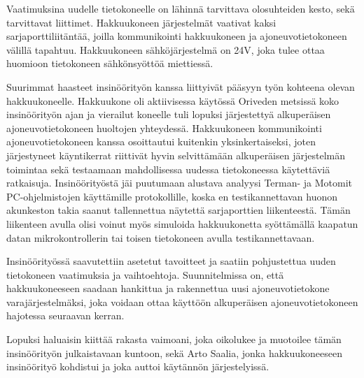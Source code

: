 \documentclass[11pt,a4paper,oneside,article]{memoir}
\begin{document}
Vaatimuksina uudelle tietokoneelle on lähinnä tarvittava olosuhteiden kesto, sekä tarvittavat liittimet. Hakkuukoneen järjestelmät vaativat kaksi sarjaporttiliitäntää, joilla kommunikointi hakkuukoneen ja ajoneuvotietokoneen välillä tapahtuu. Hakkuukoneen sähköjärjestelmä on 24V, joka tulee ottaa huomioon tietokoneen sähkönsyöttöä miettiessä. 

Suurimmat haasteet insinöörityön kanssa liittyivät pääsyyn työn kohteena olevan hakkuukoneelle. Hakkuukone oli aktiivisessa käytössä Oriveden metsissä koko insinöörityön ajan ja vierailut koneelle tuli lopuksi järjestettyä alkuperäisen ajoneuvotietokoneen huoltojen yhteydessä. Hakkuukoneen kommunikointi ajoneuvotietokoneen kanssa osoittautui kuitenkin yksinkertaiseksi, joten järjestyneet käyntikerrat riittivät hyvin selvittämään alkuperäisen järjestelmän toimintaa sekä testaamaan mahdollisessa uudessa tietokoneessa käytettäviä ratkaisuja. Insinöörityöstä jäi puutumaan alustava analyysi Terman- ja Motomit PC-ohjelmistojen käyttämille protokollille, koska en testikannettavan huonon akunkeston takia saanut tallennettua näytettä sarjaporttien liikenteestä. Tämän liikenteen avulla olisi voinut myös simuloida hakkuukonetta syöttämällä kaapatun datan mikrokontrollerin tai toisen tietokoneen avulla testikannettavaan.

Insinöörityössä saavutettiin asetetut tavoitteet ja saatiin pohjustettua uuden tietokoneen vaatimuksia ja vaihtoehtoja. Suunnitelmissa on, että hakkuukoneeseen saadaan hankittua ja rakennettua uusi ajoneuvotietokone varajärjestelmäksi, joka voidaan ottaa käyttöön alkuperäisen ajoneuvotietokoneen hajotessa seuraavan kerran.

Lopuksi haluaisin kiittää rakasta vaimoani, joka oikolukee ja muotoilee tämän insinöörityön julkaistavaan kuntoon, sekä Arto Saalia, jonka hakkuukoneeseen insinöörityö kohdistui ja joka auttoi käytännön järjestelyissä.



\begin{flushleft}
\begin{singlespacing}

\end{singlespacing}
\end{flushleft}
\end{document}
